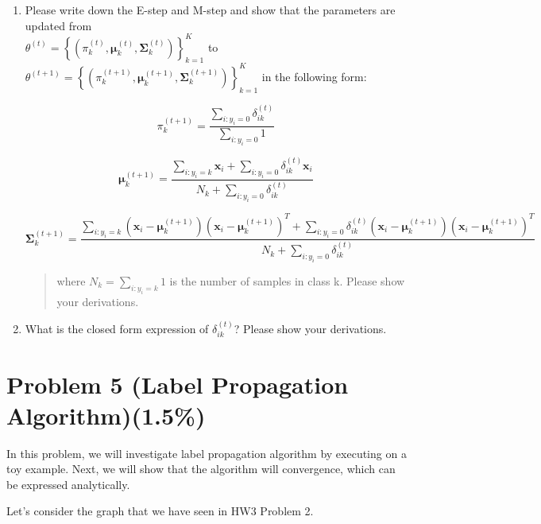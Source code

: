 \documentclass{article}
\def\vecmu{{\boldsymbol \mu}}
\begin{document}
\begin{enumerate}
\item
Please write down the E-step and M-step and show
  that the parameters are updated from \\
  \(\theta^{(t)} = \left\{ \left( \pi_{k}^{(t)},\vecmu_{k}^{(t)},\mathbf{\Sigma}_{k}^{(t)} \right) \right\}_{k = 1}^{K}\)
  to
  \(\theta^{(t + 1)} = \left\{ \left( \pi_{k}^{(t + 1)},\vecmu_{k}^{(t + 1)},\mathbf{\Sigma}_{k}^{(t + 1)} \right) \right\}_{k = 1}^{K}\)
  in the following form:


\[\pi_{k}^{(t + 1)} = \frac{\sum_{i:y_{i} = 0}^{}\delta_{ik}^{(t)}}{\sum_{i:y_i=0}1}\]

\[\vecmu_{k}^{(t + 1)} = \frac{\sum_{i:y_{i} = k}^{}\mathbf{x}_{i} + \sum_{i:y_{i} = 0}^{}{\delta_{ik}^{(t)}\mathbf{x}_{i}}}{N_{k} + \sum_{i:y_{i} = 0}^{}\delta_{ik}^{(t)}}\]

\[\mathbf{\Sigma}_{k}^{(t + 1)} = \frac{\sum_{i:y_{i} = k}^{}{\left( \mathbf{x}_{i} - \vecmu_{k}^{(t + 1)} \right)\left( \mathbf{x}_{i} - \vecmu_{k}^{(t + 1)} \right)^{T}} + \sum_{i:y_{i} = 0}^{}{\delta_{ik}^{(t)}\left( \mathbf{x}_{i} - \vecmu_{k}^{(t + 1)} \right)\left( \mathbf{x}_{i} - \vecmu_{k}^{(t + 1)} \right)^{T}}}{N_{k} + \sum_{i:y_{i} = 0}^{}\delta_{ik}^{(t)}}\]

\begin{quote}
where \(N_{k} = \sum_{i:y_{i} = k}^{}1\) is the number of samples in
class k. Please show your derivations.
\end{quote}

\item
 What is the closed form expression of
  \(\delta_{ik}^{(t)}\)? Please show your derivations.
\end{enumerate}

\section*{Problem 5 (Label Propagation Algorithm)(1.5\%)}

In this problem, we will investigate label propagation algorithm by executing on a toy example. Next, we will show that the algorithm will convergence, which can be expressed analytically.

Let's consider the graph that we have seen in HW3 Problem 2.
\end{document}

